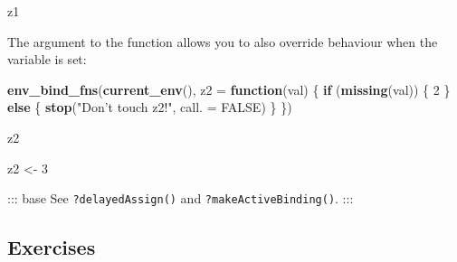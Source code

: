 \documentclass[]{book}
\newenvironment{Shaded}{\begin{snugshade}}{\end{snugshade}}
\newcommand{\KeywordTok}[1]{\textcolor[rgb]{0.13,0.29,0.53}{\textbf{#1}}}
\newcommand{\DataTypeTok}[1]{\textcolor[rgb]{0.13,0.29,0.53}{#1}}
\newcommand{\DecValTok}[1]{\textcolor[rgb]{0.00,0.00,0.81}{#1}}
\newcommand{\StringTok}[1]{\textcolor[rgb]{0.31,0.60,0.02}{#1}}
\newcommand{\OtherTok}[1]{\textcolor[rgb]{0.56,0.35,0.01}{#1}}
\newcommand{\ControlFlowTok}[1]{\textcolor[rgb]{0.13,0.29,0.53}{\textbf{#1}}}
\newcommand{\NormalTok}[1]{#1}
\theoremstyle{definition}
\theoremstyle{definition}
\theoremstyle{definition}
\theoremstyle{remark}
\begin{document}
\begin{itemize}
\begin{Shaded}
\begin{Highlighting}[]
\NormalTok{z1}
\end{Highlighting}
\end{Shaded}

  The argument to the function allows you to also override behaviour
  when the variable is set:

\begin{Shaded}
\begin{Highlighting}[]
\KeywordTok{env_bind_fns}\NormalTok{(}\KeywordTok{current_env}\NormalTok{(), }\DataTypeTok{z2 =} \ControlFlowTok{function}\NormalTok{(val) \{}
  \ControlFlowTok{if}\NormalTok{ (}\KeywordTok{missing}\NormalTok{(val)) \{}
    \DecValTok{2}
\NormalTok{  \} }\ControlFlowTok{else}\NormalTok{ \{}
     \KeywordTok{stop}\NormalTok{(}\StringTok{"Don't touch z2!"}\NormalTok{, }\DataTypeTok{call. =} \OtherTok{FALSE}\NormalTok{)}
\NormalTok{  \}}
\NormalTok{\})}

\NormalTok{z2}
\end{Highlighting}
\end{Shaded}

\begin{Shaded}
\begin{Highlighting}[]
\NormalTok{z2 <-}\StringTok{ }\DecValTok{3}
\end{Highlighting}
\end{Shaded}
\end{itemize}

::: base See \texttt{?delayedAssign()} and
\texttt{?makeActiveBinding()}. :::

\subsection{Exercises}\label{exercises-6}
\end{document}
